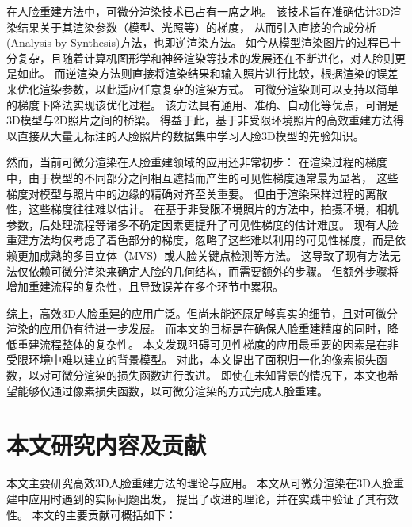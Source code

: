 在人脸重建方法中，可微分渲染技术已占有一席之地。
该技术旨在准确估计3D渲染结果关于其渲染参数（模型、光照等）的梯度，
从而引入直接的合成分析(Analysis by Synthesis)方法，也即逆渲染方法。
如今从模型渲染图片的过程已十分复杂，且随着计算机图形学和神经渲染等技术的发展还在不断进化，对人脸则更是如此。
而逆渲染方法则直接将渲染结果和输入照片进行比较，根据渲染的误差来优化渲染参数，以此适应任意复杂的渲染方式。
可微分渲染则可以支持以简单的梯度下降法实现该优化过程。
该方法具有通用、准确、自动化等优点，可谓是3D模型与2D照片之间的桥梁。
得益于此，基于非受限环境照片的高效重建方法得以直接从大量无标注的人脸照片的数据集中学习人脸3D模型的先验知识。

然而，当前可微分渲染在人脸重建领域的应用还非常初步：
在渲染过程的梯度中，由于模型的不同部分之间相互遮挡而产生的可见性梯度通常最为显著，
这些梯度对模型与照片中的边缘的精确对齐至关重要。
但由于渲染采样过程的离散性，这些梯度往往难以估计。
在基于非受限环境照片的方法中，拍摄环境，相机参数，后处理流程等诸多不确定因素更提升了可见性梯度的估计难度。
现有人脸重建方法均仅考虑了着色部分的梯度，忽略了这些难以利用的可见性梯度，而是依赖更加成熟的多目立体（MVS）或人脸关键点检测等方法。
这导致了现有方法无法仅依赖可微分渲染来确定人脸的几何结构，而需要额外的步骤。
但额外步骤将增加重建流程的复杂性，且导致误差在多个环节中累积。

综上，高效3D人脸重建的应用广泛。但尚未能还原足够真实的细节，且对可微分渲染的应用仍有待进一步发展。
而本文的目标是在确保人脸重建精度的同时，降低重建流程整体的复杂性。
本文发现阻碍可见性梯度的应用最重要的因素是在非受限环境中难以建立的背景模型。
对此，本文提出了面积归一化的像素损失函数，以对可微分渲染的损失函数进行改进。
即使在未知背景的情况下，本文也希望能够仅通过像素损失函数，以可微分渲染的方式完成人脸重建。

\section{本文研究内容及贡献}

本文主要研究高效3D人脸重建方法的理论与应用。
本文从可微分渲染在3D人脸重建中应用时遇到的实际问题出发，
提出了改进的理论，并在实践中验证了其有效性。
本文的主要贡献可概括如下：

